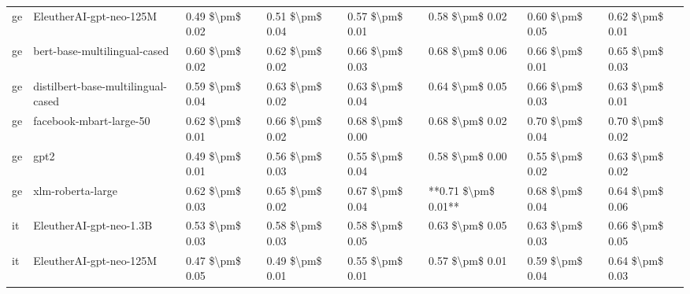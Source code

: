 \begin{tabular}{llllllll}
      ge &            EleutherAI-gpt-neo-125M & 0.49 \$\textbackslash pm\$ 0.02 &           0.51 \$\textbackslash pm\$ 0.04 &       0.57 \$\textbackslash pm\$ 0.01 &        0.58 \$\textbackslash pm\$ 0.02 &                         0.60 \$\textbackslash pm\$ 0.05 &     0.62 \$\textbackslash pm\$ 0.01 \\
      ge &       bert-base-multilingual-cased & 0.60 \$\textbackslash pm\$ 0.02 &           0.62 \$\textbackslash pm\$ 0.02 &       0.66 \$\textbackslash pm\$ 0.03 &        0.68 \$\textbackslash pm\$ 0.06 &                         0.66 \$\textbackslash pm\$ 0.01 &     0.65 \$\textbackslash pm\$ 0.03 \\
      ge & distilbert-base-multilingual-cased & 0.59 \$\textbackslash pm\$ 0.04 &           0.63 \$\textbackslash pm\$ 0.02 &       0.63 \$\textbackslash pm\$ 0.04 &        0.64 \$\textbackslash pm\$ 0.05 &                         0.66 \$\textbackslash pm\$ 0.03 &     0.63 \$\textbackslash pm\$ 0.01 \\
      ge &            facebook-mbart-large-50 & 0.62 \$\textbackslash pm\$ 0.01 &           0.66 \$\textbackslash pm\$ 0.02 &       0.68 \$\textbackslash pm\$ 0.00 &        0.68 \$\textbackslash pm\$ 0.02 &                         0.70 \$\textbackslash pm\$ 0.04 &     0.70 \$\textbackslash pm\$ 0.02 \\
      ge &                               gpt2 & 0.49 \$\textbackslash pm\$ 0.01 &           0.56 \$\textbackslash pm\$ 0.03 &       0.55 \$\textbackslash pm\$ 0.04 &        0.58 \$\textbackslash pm\$ 0.00 &                         0.55 \$\textbackslash pm\$ 0.02 &     0.63 \$\textbackslash pm\$ 0.02 \\
      ge &                  xlm-roberta-large & 0.62 \$\textbackslash pm\$ 0.03 &           0.65 \$\textbackslash pm\$ 0.02 &       0.67 \$\textbackslash pm\$ 0.04 &    **0.71 \$\textbackslash pm\$ 0.01** &                         0.68 \$\textbackslash pm\$ 0.04 &     0.64 \$\textbackslash pm\$ 0.06 \\
      it &            EleutherAI-gpt-neo-1.3B & 0.53 \$\textbackslash pm\$ 0.03 &           0.58 \$\textbackslash pm\$ 0.03 &       0.58 \$\textbackslash pm\$ 0.05 &        0.63 \$\textbackslash pm\$ 0.05 &                         0.63 \$\textbackslash pm\$ 0.03 &     0.66 \$\textbackslash pm\$ 0.05 \\
      it &            EleutherAI-gpt-neo-125M & 0.47 \$\textbackslash pm\$ 0.05 &           0.49 \$\textbackslash pm\$ 0.01 &       0.55 \$\textbackslash pm\$ 0.01 &        0.57 \$\textbackslash pm\$ 0.01 &                         0.59 \$\textbackslash pm\$ 0.04 &     0.64 \$\textbackslash pm\$ 0.03 \\

\end{tabular}
